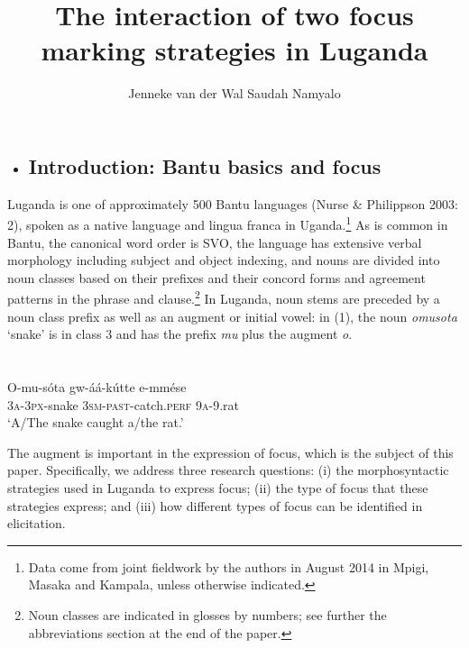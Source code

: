 \documentclass[output=paper]{langsci/langscibook}
\title{The interaction of two focus marking strategies in Luganda}
\author{%
Jenneke van der Wal \affiliation{University of Cambridge}\lastand 
 Saudah Namyalo \affiliation{Makerere University}
}
\begin{document}
 
 



\setcounter{itemize}{0}
\begin{itemize}
\item \section{ \label{bkm:Ref324606889}Introduction: Bantu basics and focus}
\end{itemize}

Luganda is one of approximately 500 Bantu languages (Nurse \& Philippson 2003: 2), spoken as a native language and lingua franca in Uganda.\footnote{ Data come from joint fieldwork by the authors in August 2014 in Mpigi, Masaka and Kampala, unless otherwise indicated.}{ }As is common in Bantu, the canonical word order is SVO, the language has extensive verbal morphology including subject and object indexing, and nouns are divided into noun classes based on their prefixes and their concord forms and agreement patterns in the phrase and clause.\footnote{ Noun classes are indicated in glosses by numbers; see further the abbreviations section at the end of the paper.}{ }In Luganda, noun stems are preceded by a noun class prefix as well as an augment or initial vowel: in (1), the noun \textit{omusota} ‘snake’ is in class 3 and has the prefix \textit{mu} plus the augment \textit{o}. 

\chapter[  ]{\textit{  }}
\gll O-mu-sóta  gw-áá-kútte      e-mmése\\
     \textsc{3a}{}-\textsc{3px}{}-snake  \textsc{3sm}{}-\textsc{past}{}-catch.\textsc{perf}  \textsc{9a}{}-9.rat\\
\glt ‘A/The snake caught a/the rat.’
\z

The augment is important in the expression of focus, which is the subject of this paper. Specifically, we address three research questions: (i) the morphosyntactic strategies used in Luganda to express focus; (ii) the type of focus that these strategies express; and (iii) how different types of focus can be identified in elicitation.
\end{document}
